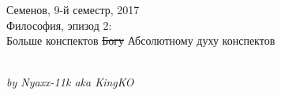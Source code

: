 

\begin{titlepage}
\par 
\vspace*{-2cm}
\begin{center}
{\sf \Large
\vspace*{1.5cm}
{\Huge Семенов, 9-й семестр, 2017}\\
{ Философия, эпизод 2:}\\
{ Больше конспектов \sout{Богу} Абсолютному духу конспектов}}\\

\vspace*{2cm}
 \\
{\small }
\begin{flushright}
\sl\small
by Nyaxx-11k aka KingKO
\end{flushright}
\end{center}
\end{titlepage}
\topmargin -1cm 
\hoffset -0.7in 
\textwidth 6.0in 
\textheight 9.0in 
\normalsize 
{}
\tableofcontents
\pagebreak

